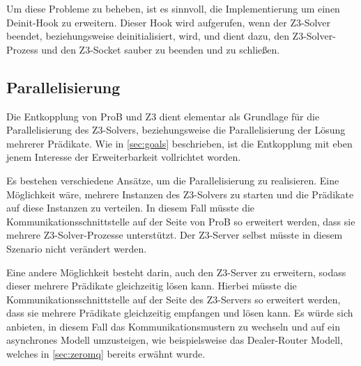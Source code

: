 Um diese Probleme zu beheben, ist es sinnvoll, die Implementierung um einen Deinit-Hook zu erweitern.
Dieser Hook wird aufgerufen, wenn der Z3-Solver beendet, beziehungsweise deinitialisiert, wird, und dient dazu, den Z3-Solver-Prozess und den Z3-Socket sauber zu beenden und zu schließen.

\subsection{Parallelisierung}

Die Entkopplung von ProB und Z3 dient elementar als Grundlage für die Parallelisierung des Z3-Solvers,
beziehungsweise die Parallelisierung der Lösung mehrerer Prädikate.
Wie in \cref{sec:goals} beschrieben, ist die Entkopplung mit eben jenem Interesse der Erweiterbarkeit vollrichtet worden.

Es bestehen verschiedene Ansätze, um die Parallelisierung zu realisieren.
Eine Möglichkeit wäre, mehrere Instanzen des Z3-Solvers zu starten und die Prädikate auf diese Instanzen zu verteilen.
In diesem Fall müsste die Kommunikationsschnittstelle auf der Seite von ProB so erweitert werden, dass sie mehrere Z3-Solver-Prozesse unterstützt.
Der Z3-Server selbst müsste in diesem Szenario nicht verändert werden.

Eine andere Möglichkeit besteht darin, auch den Z3-Server zu erweitern, sodass dieser mehrere Prädikate gleichzeitig lösen kann.
Hierbei müsste die Kommunikationsschnittstelle auf der Seite des Z3-Servers so erweitert werden, dass sie mehrere Prädikate gleichzeitig empfangen und lösen kann.
Es würde sich anbieten, in diesem Fall das Kommunikationsmustern zu wechseln und auf ein asynchrones Modell umzusteigen, wie beispielsweise das Dealer-Router Modell,
welches in \cref{sec:zeromq} bereits erwähnt wurde.
